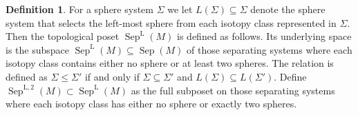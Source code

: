 \documentclass{amsart}
\theoremstyle{plain}
\theoremstyle{definition}
\newtheorem{defn}[thm]{Definition}
\DeclareMathOperator\sep{Sep} %
\newcommand{\sepL}{\sep^{\mathrm{L}}} %
\newcommand{\sepLtwo}{\sep^{\mathrm{L},2}} %
\begin{document}
\begin{defn}\label{defn:L}
    For a sphere system $\Sigma$ we let $L(\Sigma) \subseteq \Sigma$ denote the sphere system that selects the left-most sphere from each isotopy class represented in $\Sigma$.
    Then the topological poset $\sepL(M)$ is defined as follows.
    Its underlying space is the subspace 
    $\sepL(M) \subseteq \sep(M)$
    of those separating systems where each isotopy class contains either no sphere or at least two spheres.
    The relation is defined as $\Sigma \le \Sigma'$ if and only if $\Sigma \subseteq \Sigma'$ and $L(\Sigma) \subseteq L(\Sigma')$.
    Define $\sepLtwo(M) \subset \sepL(M)$ as the full subposet on those separating systems where each isotopy class has either no sphere or exactly two spheres.
\end{defn}
\end{document}
